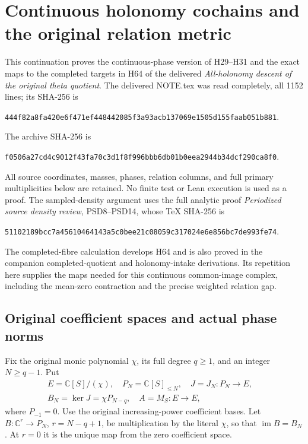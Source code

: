 \begingroup
\def\C{\mathbb{C}}
\def\R{\mathbb{R}}
\def\av{\operatorname{av}}
\def\im{\operatorname{im}}
\section{Continuous holonomy cochains and the original relation metric}



This continuation proves the continuous-phase version of H29--H31
and the exact maps to the completed targets in H64 of the delivered
\emph{All-holonomy descent of the original theta quotient}.
The delivered NOTE.tex was read completely, all 1152 lines;
its SHA-256 is
\begin{center}\small
\nolinkurl{444f82a8fa420e6f471ef448442085f3a93acb137069e1505d155faab051b881}.
\end{center}
The archive SHA-256 is
\begin{center}\small
\nolinkurl{f0506a27cd4c9012f43fa70c3d1f8f996bbb6db01b0eea2944b34dcf290ca8f0}.
\end{center}
All source coordinates, masses, phases, relation columns, and full
primary multiplicities below are retained. No finite test or Lean
execution is used as a proof.
The sampled-density argument uses the full analytic proof
\emph{Periodized source density review}, PSD8--PSD14,
whose TeX SHA-256 is
\begin{center}\small
\nolinkurl{51102189bcc7a45610464143a5c0bee21c08059c317024e6e856bc7de993fe74}.
\end{center}
The completed-fibre calculation develops H64 and is also proved
in the companion completed-quotient and holonomy-intake derivations.
Its repetition here supplies the maps needed for this continuous
common-image complex, including the mean-zero contraction and
the precise weighted relation gap.

\subsection{Original coefficient spaces and actual phase norms}

Fix the original monic polynomial $\chi$, its full degree $q\ge1$,
and an integer $N\ge q-1$. Put
\[
 \begin{gathered}
 E=\C[S]/(\chi),\quad P_N=\C[S]_{\le N},\quad
 J=J_N:P_N\longrightarrow E,\quad\\
 B_N=\ker J=\chi P_{N-q},\quad A=M_S:E\longrightarrow E,
 \end{gathered}
 \tag{HCD1}
\]
where $P_{-1}=0$. Use the original increasing-power coefficient
bases. Let $B:\C^r\to P_N$, $r=N-q+1$, be multiplication by
the literal $\chi$, so that $\im B=B_N$. At $r=0$ it is the
unique map from the zero coefficient space.

